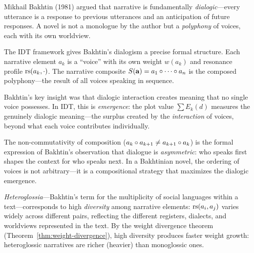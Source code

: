 \begin{remark}
\label{rem:bakhtin}
Mikhail Bakhtin (1981) argued that narrative is fundamentally
\emph{dialogic}---every utterance is a response to previous utterances and
an anticipation of future responses.  A novel is not a monologue by the
author but a \emph{polyphony} of voices, each with its own worldview.

The IDT framework gives Bakhtin's dialogism a precise formal structure.
Each narrative element $a_k$ is a ``voice'' with its own weight $w(a_k)$
and resonance profile $\mathrm{rs}(a_k, \cdot)$.  The narrative composite
$S(\mathbf{a}) = a_1 \circ \cdots \circ a_n$ is the composed
polyphony---the result of all voices speaking in sequence.

Bakhtin's key insight was that dialogic interaction creates meaning that
no single voice possesses.  In IDT, this is \emph{emergence}: the plot
value $\sum E_k(d)$ measures the genuinely dialogic meaning---the surplus
created by the \emph{interaction} of voices, beyond what each voice
contributes individually.

The non-commutativity of composition ($a_k \circ a_{k+1} \neq
a_{k+1} \circ a_k$) is the formal expression of Bakhtin's observation
that dialogue is \emph{asymmetric}: who speaks first shapes the context
for who speaks next.  In a Bakhtinian novel, the ordering of voices is not
arbitrary---it is a compositional strategy that maximizes the dialogic
emergence.

\emph{Heteroglossia}---Bakhtin's term for the multiplicity of social
languages within a text---corresponds to high \emph{diversity} among
narrative elements: $\mathrm{rs}(a_i, a_j)$ varies widely across different pairs,
reflecting the different registers, dialects, and worldviews represented in
the text.  By the weight divergence theorem
(Theorem~\ref{thm:weight-divergence}), high diversity produces faster weight
growth: heteroglossic narratives are richer (heavier) than monoglossic ones.
\end{remark}

